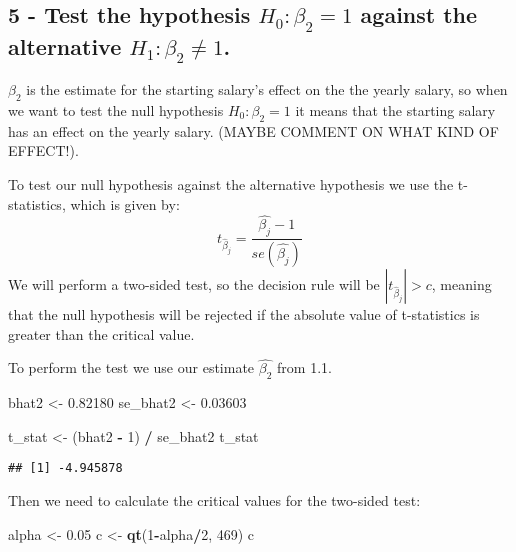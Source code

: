 \documentclass[
]{article}
\newenvironment{Shaded}{\begin{snugshade}}{\end{snugshade}}
\newcommand{\DecValTok}[1]{\textcolor[rgb]{0.00,0.00,0.81}{#1}}
\newcommand{\FloatTok}[1]{\textcolor[rgb]{0.00,0.00,0.81}{#1}}
\newcommand{\FunctionTok}[1]{\textcolor[rgb]{0.13,0.29,0.53}{\textbf{#1}}}
\newcommand{\NormalTok}[1]{#1}
\newcommand{\OtherTok}[1]{\textcolor[rgb]{0.56,0.35,0.01}{#1}}
\newcommand{\SpecialCharTok}[1]{\textcolor[rgb]{0.81,0.36,0.00}{\textbf{#1}}}
\begin{document}
\subsection{\texorpdfstring{5 - Test the hypothesis \(H_0:\beta_2 = 1\)
against the alternative
\(H_1: \beta_2 \neq 1\).}{5 - Test the hypothesis H\_0:\textbackslash beta\_2 = 1 against the alternative H\_1: \textbackslash beta\_2 \textbackslash neq 1.}}\label{test-the-hypothesis-h_0beta_2-1-against-the-alternative-h_1-beta_2-neq-1.}

\(\beta_2\) is the estimate for the starting salary's effect on the the
yearly salary, so when we want to test the null hypothesis
\(H_0:\beta_2 = 1\) it means that the starting salary has an effect on
the yearly salary. (MAYBE COMMENT ON WHAT KIND OF EFFECT!).

To test our null hypothesis against the alternative hypothesis we use
the t-statistics, which is given by:
\[t_{{\hat\beta}_j}=\frac{\hat{\beta_j}-1}{se(\hat{\beta_j})}\] We will
perform a two-sided test, so the decision rule will be
\(|t_{{\hat\beta}_j}|>c\), meaning that the null hypothesis will be
rejected if the absolute value of t-statistics is greater than the
critical value.

To perform the test we use our estimate \(\hat{\beta_2}\) from 1.1.

\begin{Shaded}
\begin{Highlighting}[]
\NormalTok{bhat2 }\OtherTok{\textless{}{-}} \FloatTok{0.82180}
\NormalTok{se\_bhat2 }\OtherTok{\textless{}{-}} \FloatTok{0.03603}

\NormalTok{t\_stat }\OtherTok{\textless{}{-}}\NormalTok{ (bhat2 }\SpecialCharTok{{-}} \DecValTok{1}\NormalTok{) }\SpecialCharTok{/}\NormalTok{ se\_bhat2}
\NormalTok{t\_stat}
\end{Highlighting}
\end{Shaded}

\begin{verbatim}
## [1] -4.945878
\end{verbatim}

Then we need to calculate the critical values for the two-sided test:

\begin{Shaded}
\begin{Highlighting}[]
\NormalTok{alpha }\OtherTok{\textless{}{-}} \FloatTok{0.05}
\NormalTok{c }\OtherTok{\textless{}{-}} \FunctionTok{qt}\NormalTok{(}\DecValTok{1}\SpecialCharTok{{-}}\NormalTok{alpha}\SpecialCharTok{/}\DecValTok{2}\NormalTok{, }\DecValTok{469}\NormalTok{)}
\NormalTok{c}
\end{Highlighting}
\end{Shaded}
\end{document}
